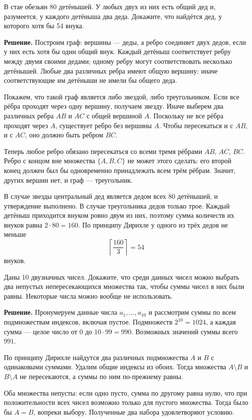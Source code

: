 \begin{problems}
\item В стае обезьян 80 детёнышей. У любых двух из них есть общий дед и, разумеется, у каждого детёныша два деда. Докажите, что найдётся дед, у которого хотя бы 54 внука.
\par\smallskip\noindent\textbf{Решение.} Построим граф: вершины --- деды, а ребро соединяет двух дедов, если у них есть хотя бы один общий внук. Каждый детёныш соответствует ребру между двумя своими дедами; одному ребру могут соответствовать несколько детёнышей. Любые два различных ребра имеют общую вершину: иначе соответствующие им детёныши не имели бы общего деда.
\par Покажем, что такой граф является либо звездой, либо треугольником. Если все рёбра проходят через одну вершину, получаем звезду. Иначе выберем два различных ребра $AB$ и $AC$ с общей вершиной $A$. Поскольку не все рёбра проходят через $A$, существует ребро без вершины $A$. Чтобы пересекаться и с $AB$, и с $AC$, оно должно быть ребром $BC$.
\par Теперь любое ребро обязано пересекаться со всеми тремя рёбрами $AB$, $AC$, $BC$. Ребро с концом вне множества $\{A,B,C\}$ не может этого сделать: его второй конец должен был бы одновременно принадлежать всем трём рёбрам. Значит, других вершин нет, и граф --- треугольник.
\par В случае звезды центральный дед является дедом всех $80$ детёнышей, и утверждение выполнено. В случае треугольника дедов только трое. Каждый детёныш приходится внуком ровно двум из них, поэтому сумма количеств их внуков равна $2\cdot80=160$. По принципу Дирихле у одного из трёх дедов не меньше
\[
\left\lceil\frac{160}{3}\right\rceil=54
\]
внуков.\par

\item Даны 10 двузначных чисел. Докажите, что среди данных чисел можно выбрать два непустых непересекающихся множества так, чтобы суммы чисел в них были равны. Некоторые числа можно вообще не использовать.
\par\smallskip\noindent\textbf{Решение.} Пронумеруем данные числа $a_1,\ldots,a_{10}$ и рассмотрим суммы по всем подмножествам индексов, включая пустое. Подмножеств $2^{10}=1024$, а каждая сумма --- целое число от $0$ до $10\cdot99=990$. Возможных значений суммы всего $991$.
\par По принципу Дирихле найдутся два различных подмножества $A$ и $B$ с одинаковыми суммами. Удалим общие индексы из обоих. Тогда множества $A\setminus B$ и $B\setminus A$ не пересекаются, а суммы по ним по-прежнему равны.
\par Оба множества непусты: если одно пусто, сумма по другому равна нулю, что при положительности всех чисел возможно только для пустого множества. Тогда было бы $A=B$, вопреки выбору. Полученные два набора удовлетворяют условию.\par


\end{problems}
